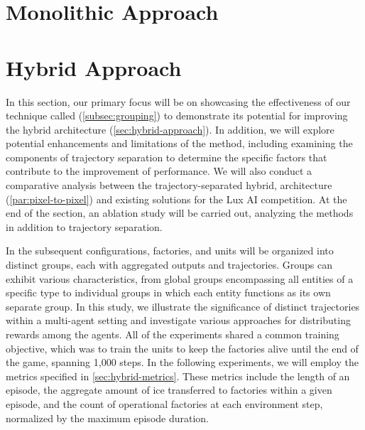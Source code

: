 \section{Monolithic Approach}
\label{sec:monolithic-approach-results}

\section{Hybrid Approach}
\label{sec:hybrid-approach-results}

\noindent In this section, our primary focus will be on showcasing the effectiveness of our technique called  (\autoref{subsec:grouping}) to demonstrate its potential for improving the hybrid architecture (\autoref{sec:hybrid-approach}). In addition, we will explore potential enhancements and limitations of the method, including examining the components of trajectory separation to determine the specific factors that contribute to the improvement of performance. We will also conduct a comparative analysis between the trajectory-separated hybrid,  architecture (\autoref{par:pixel-to-pixel}) and existing solutions for the Lux AI competition. At the end of the section, an ablation study will be carried out, analyzing the methods in addition to trajectory separation.

\bigskip

\noindent In the subsequent configurations, factories, and units will be organized into distinct groups, each with aggregated outputs and trajectories. Groups can exhibit various characteristics, from global groups encompassing all entities of a specific type to individual groups in which each entity functions as its own separate group. In this study, we illustrate the significance of distinct trajectories within a multi-agent setting and investigate various approaches for distributing rewards among the agents. All of the experiments shared a common training objective, which was to train the units to keep the factories alive until the end of the game, spanning 1,000 steps. In the following experiments, we will employ the metrics specified in \autoref{sec:hybrid-metrics}. These metrics include the length of an episode, the aggregate amount of ice transferred to factories within a given episode, and the count of operational factories at each environment step, normalized by the maximum episode duration.

\bigskip

